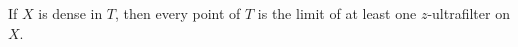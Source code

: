 If $X$ is dense in $T$, then every point of $T$ is the limit of at least one $z$-ultrafilter on $X$.

